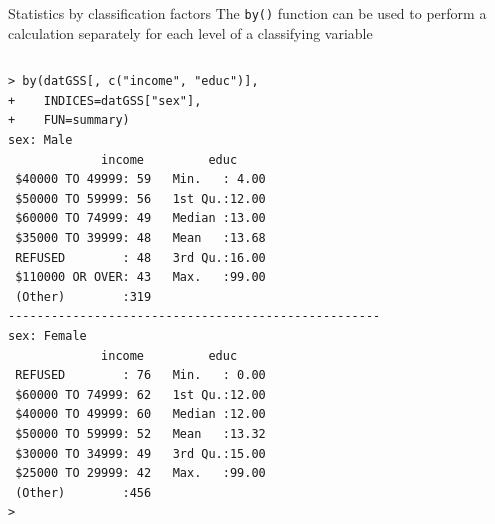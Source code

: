 \documentclass[table,smaller]{beamer}
\begin{document}
\begin{frame}[fragile,label=sec-6-3]{Statistics by classification factors}
 The \verb~by()~ function can be used to perform a calculation separately for each level of a classifying variable
\vspace{-.5em}
\begin{columns}
\begin{block}{}
\begin{verbatim}
> by(datGSS[, c("income", "educ")],
+    INDICES=datGSS["sex"],
+    FUN=summary)
sex: Male
             income         educ      
 $40000 TO 49999: 59   Min.   : 4.00  
 $50000 TO 59999: 56   1st Qu.:12.00  
 $60000 TO 74999: 49   Median :13.00  
 $35000 TO 39999: 48   Mean   :13.68  
 REFUSED        : 48   3rd Qu.:16.00  
 $110000 OR OVER: 43   Max.   :99.00  
 (Other)        :319                  
---------------------------------------------------- 
sex: Female
             income         educ      
 REFUSED        : 76   Min.   : 0.00  
 $60000 TO 74999: 62   1st Qu.:12.00  
 $40000 TO 49999: 60   Median :12.00  
 $50000 TO 59999: 52   Mean   :13.32  
 $30000 TO 34999: 49   3rd Qu.:15.00  
 $25000 TO 29999: 42   Max.   :99.00  
 (Other)        :456                  
>
\end{verbatim}
\end{block}
\end{columns}
\vspace{.5em}
\end{frame}
\end{document}
